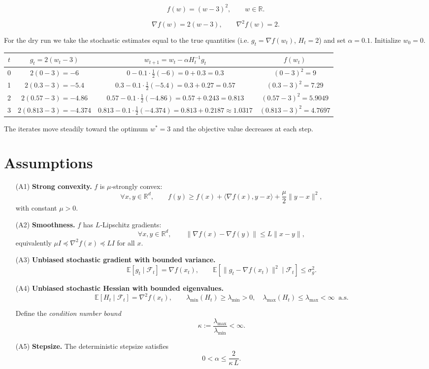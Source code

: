 \documentclass[11pt]{article}
\newcommand{\E}{\mathbb{E}}
\newcommand{\R}{\mathbb{R}}
\begin{document}
\[
f(w)=(w-3)^{2},\qquad w\in\R .
\]

\[
\nabla f(w)=2(w-3),\qquad \nabla^{2}f(w)=2 .
\]

For the dry run we take the stochastic estimates equal to the true
quantities (i.e. $g_{t}= \nabla f(w_{t})$, $H_{t}=2$) and set $\alpha=0.1$.
Initialize $w_{0}=0$.

\begin{center}
\begin{tabular}{c|c|c|c}
$t$ & $g_{t}=2(w_{t}-3)$ & $w_{t+1}=w_{t}-\alpha H_{t}^{-1}g_{t}$ & $f(w_{t})$\\ \hline
0 & $2(0-3)=-6$ & $0-0.1\cdot\frac{1}{2}(-6)=0+0.3=0.3$ & $(0-3)^{2}=9$\\
1 & $2(0.3-3)=-5.4$ & $0.3-0.1\cdot\frac{1}{2}(-5.4)=0.3+0.27=0.57$ & $(0.3-3)^{2}=7.29$\\
2 & $2(0.57-3)=-4.86$ & $0.57-0.1\cdot\frac{1}{2}(-4.86)=0.57+0.243=0.813$ & $(0.57-3)^{2}=5.9049$\\
3 & $2(0.813-3)=-4.374$ & $0.813-0.1\cdot\frac{1}{2}(-4.374)=0.813+0.2187\approx1.0317$ & $(0.813-3)^{2}=4.7697$
\end{tabular}
\end{center}

The iterates move steadily toward the optimum $w^{*}=3$ and the objective
value decreases at each step.

\section*{Assumptions}
\begin{enumerate}
\item[(A1)] \textbf{Strong convexity.} $f$ is $\mu$‑strongly convex:
\[
\forall x,y\in\R^{d},\qquad 
f(y)\ge f(x)+\langle\nabla f(x),y-x\rangle+\frac{\mu}{2}\|y-x\|^{2},
\]
with constant $\mu>0$.

\item[(A2)] \textbf{Smoothness.} $f$ has $L$‑Lipschitz gradients:
\[
\forall x,y\in\R^{d},\qquad 
\|\nabla f(x)-\nabla f(y)\|\le L\|x-y\|,
\]
equivalently $ \mu I\preceq \nabla^{2}f(x)\preceq L I$ for all $x$.

\item[(A3)] \textbf{Unbiased stochastic gradient with bounded variance.}
\[
\E[g_{t}\mid\mathcal{F}_{t}]=\nabla f(x_{t}),\qquad 
\E[\|g_{t}-\nabla f(x_{t})\|^{2}\mid\mathcal{F}_{t}]\le\sigma_{g}^{2}.
\]

\item[(A4)] \textbf{Unbiased stochastic Hessian with bounded eigenvalues.}
\[
\E[H_{t}\mid\mathcal{F}_{t}]=\nabla^{2}f(x_{t}),\qquad
\lambda_{\min}(H_{t})\ge \lambda_{\min}>0,\quad 
\lambda_{\max}(H_{t})\le \lambda_{\max}<\infty\;\;\text{a.s.}
\]

Define the \emph{condition number bound}
\[
\kappa:=\frac{\lambda_{\max}}{\lambda_{\min}}<\infty .
\]

\item[(A5)] \textbf{Stepsize.} The deterministic stepsize satisfies
\[
0<\alpha\le \frac{2}{\kappa\,L}.
\]
\end{enumerate}
\end{document}
